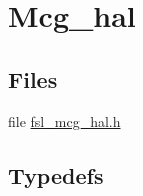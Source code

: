 \hypertarget{group__mcg__hal}{}\section{Mcg\+\_\+hal}
\label{group__mcg__hal}
\subsection*{Files}
\begin{DoxyCompactItemize}
\item 
file \hyperlink{fsl__mcg__hal_8h}{fsl\+\_\+mcg\+\_\+hal.\+h}
\end{DoxyCompactItemize}
\subsection*{Typedefs}
